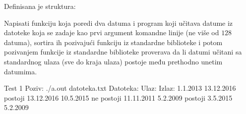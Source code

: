 \begin{Answer}[ref=524]
\end{Answer}
\begin{Exercise}[label=525]
  Definisana je struktura:
  \begin{ckod}
    typedef struct { int dan; int mesec; int godina; } Datum;}
  \end{ckod}
  Napisati funkciju koja poredi dva datuma i program koji učitava
  datume iz datoteke koja se zadaje kao prvi argument komandne linije
  (ne više od $128$ datuma), sortira ih pozivajući funkciju
   iz standardne biblioteke i potom pozivanjem funkcije
   iz standardne biblioteke proverava da li datumi
  učitani sa standardnog ulaza (sve do kraja ulaza) postoje među
  prethodno unetim datumima.
  
\begin{maxitest}
\begin{test}{Test 1}
Poziv: ./a.out datoteka.txt
Datoteka:            Ulaz:             Izlaz:
1.1.2013             13.12.2016        postoji
13.12.2016           10.5.2015         ne postoji
11.11.2011           5.2.2009          postoji
3.5.2015
5.2.2009
\end{test}
\end{maxitest}
  
\end{Exercise}

